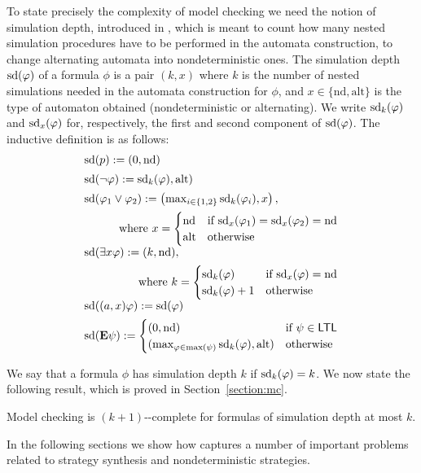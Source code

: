 To state precisely the complexity of model checking \SLref we need the
 notion of simulation depth, introduced in ,
 which is meant to count how many nested simulation procedures have to
 be performed in the automata construction, to change alternating
 automata into nondeterministic ones. The simulation depth
 $\mbox{sd}(\varphi)$ of a formula $\phi$ is a pair $(k,x)$ where $k$ is the
 number of nested simulations needed in the automata construction for
 $\phi$, and $x\in\{\text{nd},\text{alt}\}$ is the type of automaton
 obtained (nondeterministic or alternating). We write $\mbox{sd}_k(\varphi)$
 and $\mbox{sd}_x(\varphi)$ for, respectively, the first and second component of $\mbox{sd}(\varphi)$.
 The inductive definition is as follows:
      \[
        \begin{array}{l}%
          \ndd(p) \egdef (0,\nd)\\[5pt]
          \ndd(\neg \phi) \egdef \ndd_k(\phi),\alt)\\[5pt]
          \ndd(\phi_1\ou\phi_2) \egdef \left
          (\max_{i\in\{1,2\}}\ndd_k(\phi_i), x \right ),\\[5pt]
          \hfill \mbox{where
          }x=    \begin{cases}
            \nd & \mbox{if }\ndd_x(\phi_1)=\ndd_x(\phi_2)=\nd\\
            \alt & \mbox{otherwise}
          \end{cases}
          \\[5pt]
          \ndd( \exists\var\phi)\egdef (k,\nd),\\[5pt]
          \hfill \mbox{where }
          k=\begin{cases}
            \ndd_k(\phi) & \mbox{if }\ndd_x(\phi)=\nd \\
            \ndd_k(\phi)+1 & \mbox{otherwise}
          \end{cases} \\[5pt]
          \ndd(\bind{\var}\phi) \egdef \ndd(\phi)\\[5pt]
          \ndd(\Eout\psi)\egdef
          \begin{cases}
            (0,\nd) &\mbox{if }\psi\in\LTL\\
            (\max_{\phi\in\max(\psi)}\ndd_k(\phi),\alt) &\mbox{otherwise}
          \end{cases}                                                        
        \end{array}
      \]

We say that a formula $\phi$ has simulation depth $k$ if
$\mbox{sd}_k(\varphi)=k$.  We now state the following result, which is proved
in Section~\ref{section:mc}.

\begin{theorem}
  \label{theo-SLref}
  Model checking \SLref is $(k+1)$-\EXPTIME-complete for formulas of
  simulation depth at most $k$.
\end{theorem}

In the following sections we  show how \SLref captures a number of
important problems related to strategy synthesis and nondeterministic strategies. 






